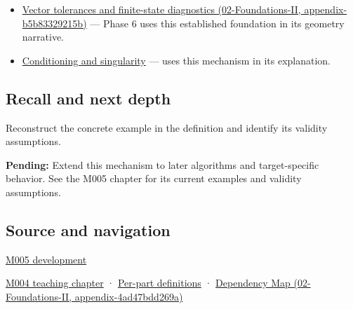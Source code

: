 \begin{itemize}
\item
  \href{../02-Foundations-II/main.pdf\#nameddest=appendix-b5b83329215b}{Vector tolerances and finite-state diagnostics (02-Foundations-II, appendix-b5b83329215b)} --- Phase 6 uses this established foundation in its geometry narrative.
\item
  \hyperref[appendix-8f6a01f284a7]{Conditioning and singularity} --- uses this mechanism in its explanation.
\end{itemize}

\subsection{Recall and next depth}\label{appendix-0ec599f8ba27-recall-and-next-depth}

Reconstruct the concrete example in the definition and identify its validity assumptions.

\textbf{Pending:} Extend this mechanism to later algorithms and target-specific behavior. See the M005 chapter for its current examples and validity assumptions.

\subsection{Source and navigation}\label{appendix-0ec599f8ba27-source-and-navigation}

\hyperref[01-foundations-i-ch001-when-arithmetic-meets-uncertainty]{M005 development}

\hyperref[01-foundations-i-ch001-a-stretching-ruler-for-real-valued-quantities]{M004 teaching chapter} · \hyperref[appendix-fd090d982a15-m004---parts-61-76]{Per-part definitions} · \href{../02-Foundations-II/main.pdf\#nameddest=appendix-4ad47bdd269a}{Dependency Map (02-Foundations-II, appendix-4ad47bdd269a)}
